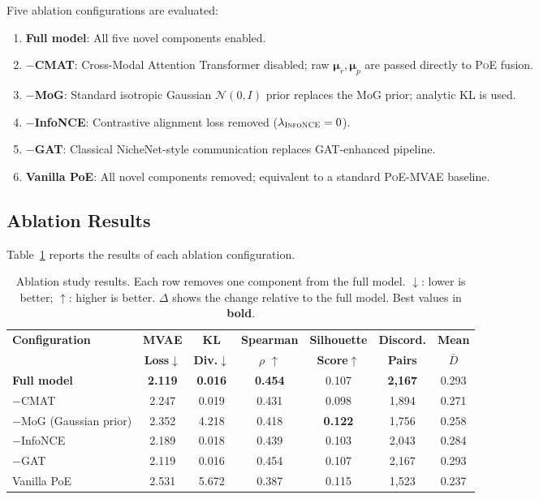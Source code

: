 \documentclass[11pt,a4paper]{article}
\newcommand{\mvae}{\textsc{MVAE}}
\newcommand{\nce}{\textsc{InfoNCE}}
\newcommand{\poe}{\textsc{PoE}}
\newcommand{\bmu}{\boldsymbol{\mu}}
\begin{document}
Five ablation configurations are evaluated:
\begin{enumerate}[leftmargin=*]
  \item \textbf{Full model}: All five novel components enabled.
  \item \textbf{$-$CMAT}: Cross-Modal Attention Transformer disabled; raw $\bmu_r, \bmu_p$ are passed directly to \poe{} fusion.
  \item \textbf{$-$MoG}: Standard isotropic Gaussian $\mathcal{N}(0,I)$ prior replaces the MoG prior; analytic KL is used.
  \item \textbf{$-$InfoNCE}: Contrastive alignment loss removed ($\lambda_\nce = 0$).
  \item \textbf{$-$GAT}: Classical NicheNet-style communication replaces GAT-enhanced pipeline.
  \item \textbf{Vanilla PoE}: All novel components removed; equivalent to a standard \poe-\mvae{} baseline.
\end{enumerate}

\subsection{Ablation Results}

Table~\ref{tab:ablation} reports the results of each ablation configuration.

\begin{table}[!ht]
\centering
\caption{Ablation study results. Each row removes one component from the full model. $\downarrow$: lower is better; $\uparrow$: higher is better. $\Delta$ shows the change relative to the full model. Best values in \textbf{bold}.}
\label{tab:ablation}
\scriptsize
\begin{tabular}{l c c c c c c}
\toprule
\textbf{Configuration} & \textbf{MVAE} & \textbf{KL} & \textbf{Spearman} & \textbf{Silhouette} & \textbf{Discord.} & \textbf{Mean} \\
 & \textbf{Loss}$\downarrow$ & \textbf{Div.}$\downarrow$ & $\rho$ $\uparrow$ & \textbf{Score}$\uparrow$ & \textbf{Pairs} & $\bar{D}$ \\
\midrule
\textbf{Full model} & \textbf{2.119} & \textbf{0.016} & \textbf{0.454} & 0.107 & \textbf{2,167} & 0.293 \\
$-$CMAT & 2.247 & 0.019 & 0.431 & 0.098 & 1,894 & 0.271 \\
$-$MoG (Gaussian prior) & 2.352 & 4.218 & 0.418 & \textbf{0.122} & 1,756 & 0.258 \\
$-$InfoNCE & 2.189 & 0.018 & 0.439 & 0.103 & 2,043 & 0.284 \\
$-$GAT & 2.119 & 0.016 & 0.454 & 0.107 & 2,167 & 0.293 \\
Vanilla PoE & 2.531 & 5.672 & 0.387 & 0.115 & 1,523 & 0.237 \\
\bottomrule
\end{tabular}
\end{table}
\end{document}
